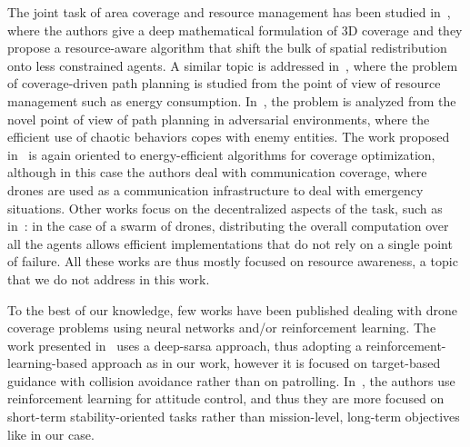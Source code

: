 \documentclass{article}
\begin{document}
The joint task of area coverage and resource management has been studied in~\cite{bentz20173d}, where the authors give a deep mathematical formulation of 3D coverage and they propose a resource-aware algorithm that shift the bulk of spatial redistribution onto less constrained agents. A similar topic is addressed in~\cite{difranco2015energy}, where the problem of coverage-driven path planning is studied from the point of view of resource management such as energy consumption. In~\cite{Curiac2015path}, the problem is analyzed from the novel point of view of path planning in adversarial environments, where the efficient use of chaotic behaviors copes with enemy entities. 
The work proposed in~\cite{liu2018energy} is again oriented to energy-efficient algorithms for coverage optimization, although in this case the authors deal with communication coverage, where drones are used as a communication infrastructure to deal with emergency situations.
Other works focus on the decentralized aspects of the task, such as in~\cite{zargar2016decentralized}: in the case of a swarm of drones, distributing the overall computation over all the agents allows efficient implementations that do not rely on a single point of failure. All these works are thus mostly focused on resource awareness, a topic that we do not address in this work.

To the best of our knowledge, few works have been published dealing with drone coverage problems using neural networks and/or reinforcement learning. The work presented in~\cite{luo2018deep} uses a deep-sarsa approach, thus adopting a reinforcement-learning-based approach as in our work, however it is focused on target-based guidance with collision avoidance rather than on patrolling. In~\cite{koch2019reinforcement}, the authors use reinforcement learning for attitude control, and thus they are more focused on short-term stability-oriented tasks rather than mission-level, long-term objectives like in our case.


\end{document}
